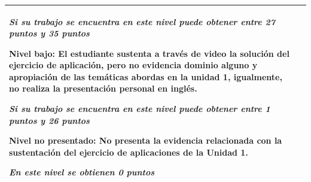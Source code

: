 \documentclass[12pt,letterpaper]{article}
\begin{document}
\begin{tabularx}{\textwidth}{|>{\bfseries}p{4cm}|X|}
\textit{Si su trabajo se encuentra en este nivel puede obtener entre 27 puntos y 35 puntos}

\textbf{Nivel bajo:} El estudiante sustenta a través de video la solución del ejercicio de aplicación, pero no evidencia dominio alguno y apropiación de las temáticas abordas en la unidad 1, igualmente, no realiza la presentación personal en inglés.

\textit{Si su trabajo se encuentra en este nivel puede obtener entre 1 puntos y 26 puntos}

\textbf{Nivel no presentado:} No presenta la evidencia relacionada con la sustentación del ejercicio de aplicaciones de la Unidad 1.

\textit{En este nivel se obtienen 0 puntos} \\
\hline
\end{tabularx}

\newpage
\end{document}
